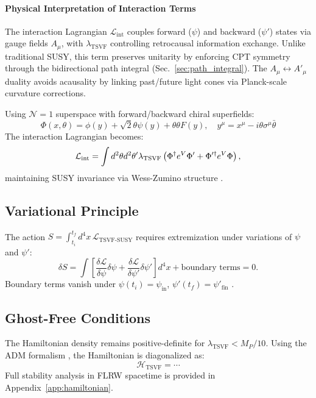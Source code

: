 \documentclass[twocolumn,superscriptaddress,floatfix]{revtex4-2}
\begin{document}
\paragraph{Physical Interpretation of Interaction Terms}  
The interaction Lagrangian $\mathcal{L}_{\text{int}}$ couples forward ($\psi$) and backward ($\psi'$) states via gauge fields $A_\mu$, with $\lambda_{\text{TSVF}}$ controlling retrocausal information exchange. Unlike traditional SUSY, this term preserves unitarity by enforcing CPT symmetry through the bidirectional path integral (Sec.~\ref{sec:path_integral}). The $A_\mu \leftrightarrow A'_\mu$ duality avoids acausality by linking past/future light cones via Planck-scale curvature corrections.

Using $\mathcal{N}=1$ superspace with forward/backward chiral superfields:
\begin{equation}
\Phi(x,\theta) = \phi(y) + \sqrt{2}\theta\psi(y) + \theta\theta F(y), \quad y^\mu = x^\mu - i\theta\sigma^\mu\bar\theta
\label{eq:chiral_superfield}
\end{equation}
The interaction Lagrangian becomes:
\begin{equation}
\mathcal{L}_{\rm int} = \int d^2\theta d^2\theta' \lambda_{\rm TSVF} \left( \Phi^\dagger e^{V}\Phi' + \Phi'^\dagger e^{V}\Phi \right),
\label{eq:superspace_interaction}
\end{equation}
maintaining SUSY invariance via Wess-Zumino structure \cite{Wess:1992}.


\subsection{Variational Principle}  
\label{subsec:variational}    

The action $S = \int_{t_i}^{t_f} d^4x\, \mathcal{L}_{\text{TSVF-SUSY}}$ requires extremization under variations of $\psi$ and $\psi'$:  
\begin{equation}  
\delta S = \int \left[\frac{\delta\mathcal{L}}{\delta\psi}\delta\psi + \frac{\delta\mathcal{L}}{\delta\psi'}\delta\psi'\right] d^4x + \text{boundary terms} = 0.  
\label{eq:action_variation}   
\end{equation}  
Boundary terms vanish under $\psi(t_i) = \psi_{\text{in}}$, $\psi'(t_f) = \psi'_{\text{fin}}$ \cite{Reuter1998}.  

\subsection{Ghost-Free Conditions}  
The Hamiltonian density remains positive-definite for \(\lambda_{\text{TSVF}} < M_P/10\). Using the ADM formalism \cite{Ashtekar2004}, the Hamiltonian is diagonalized as:  
\begin{equation}  
\mathcal{H}_{\text{TSVF}} = \cdots  
\label{eq:hamiltonian}  
\end{equation}  
Full stability analysis in FLRW spacetime is provided in Appendix~\ref{app:hamiltonian}. 
\end{document}

